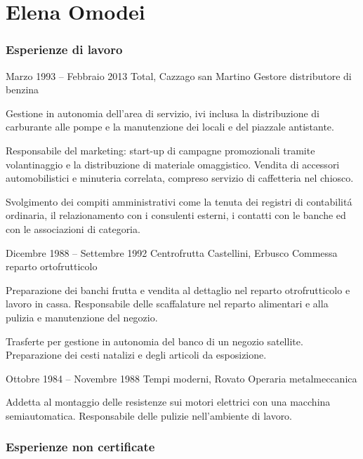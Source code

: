 \documentclass[fontsize=10pt]{tccv}
\begin{document}
\part{Elena Omodei}


\section{Esperienze di lavoro}

\begin{eventlist}

\item{Marzo 1993 -- Febbraio 2013}
     {Total, Cazzago san Martino}
     {Gestore distributore di benzina}

Gestione in autonomia dell'area di servizio, ivi inclusa la
distribuzione di carburante alle pompe e la manutenzione dei locali e
del piazzale antistante.

Responsabile del marketing: start-up di campagne promozionali tramite
volantinaggio e la distribuzione di materiale omaggistico. Vendita di
accessori automobilistici e minuteria correlata, compreso servizio di
caffetteria nel chiosco.

Svolgimento dei compiti amministrativi come la tenuta dei registri di
contabilit\'a ordinaria, il relazionamento con i consulenti esterni, i
contatti con le banche ed con le associazioni di categoria.

\item{Dicembre 1988 -- Settembre 1992}
     {Centrofrutta Castellini, Erbusco}
     {Commessa reparto ortofrutticolo}

Preparazione dei banchi frutta e vendita al dettaglio nel reparto
otrofrutticolo e lavoro in cassa. Responsabile delle scaffalature nel
reparto alimentari e alla pulizia e manutenzione del negozio.

Trasferte per gestione in autonomia del banco di un negozio satellite.
Preparazione dei cesti natalizi e degli articoli da esposizione.

\item{Ottobre 1984 -- Novembre 1988}
     {Tempi moderni, Rovato}
     {Operaria metalmeccanica}

Addetta al montaggio delle resistenze sui motori elettrici con una
macchina semiautomatica. Responsabile delle pulizie nell'ambiente di
lavoro.

\end{eventlist}

\section{Esperienze non certificate}
\end{document}
